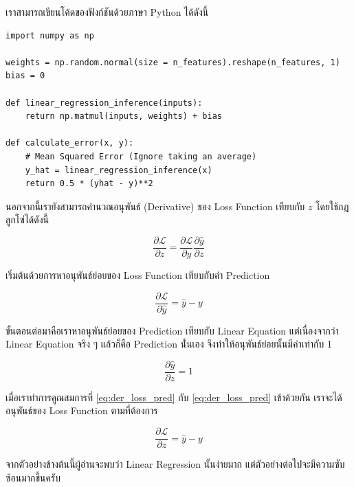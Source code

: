 เราสามารถเขียนโค้ดของฟังก์ชันด้วยภาษา Python ได้ดังนี้

\begin{lstlisting}[style=MyPython]
import numpy as np

weights = np.random.normal(size = n_features).reshape(n_features, 1)
bias = 0

def linear_regression_inference(inputs):
    return np.matmul(inputs, weights) + bias   

def calculate_error(x, y):
    # Mean Squared Error (Ignore taking an average)
    y_hat = linear_regression_inference(x)
    return 0.5 * (yhat - y)**2 
\end{lstlisting}

\vspace{1em}
นอกจากนี้เรายังสามารถคำนวณอนุพันธ์ (Derivative) ของ Loss Function เทียบกับ $z$ โดยใช้กฎลูกโซ่ได้ดังนี้

\begin{equation}\label{eq:loss_chain_rule}
    \frac{\partial \mathcal{L}}{\partial z} =
    \frac{\partial \mathcal{L}}{\partial \hat{y}} \frac{\partial \hat{y}}{\partial z}
\end{equation}

\noindent เริ่มต้นด้วยการหาอนุพันธ์ย่อยของ Loss Function เทียบกับค่า Prediction

\begin{equation}\label{eq:der_loss_pred}
    \frac{\partial \mathcal{L}}{\partial \hat{y}} = \hat{y} - y
\end{equation}

\noindent ขั้นตอนต่อมาคือเราหาอนุพันธ์ย่อยของ Prediction เทียบกับ Linear Equation แต่เนื่องจากว่า Linear Equation จริง ๆ แล้วก็คือ Prediction นั่่นเอง จึงทำให้อนุพันธ์ย่อยนั้นมีค่าเท่ากับ 1

\begin{equation}\label{eq:der_pred_lin_eq}
    \frac{\partial \hat{y}}{\partial z} = 1
\end{equation}

\noindent เมื่อเราทำการคูณสมการที่ \eqref{eq:der_loss_pred} กับ \eqref{eq:der_loss_pred} เข้าด้วยกัน เราจะได้อนุพันธ์ของ Loss
Function ตามที่ต้องการ

\begin{equation}\label{eq:der_loss_lin_eq}
    \frac{\partial \mathcal{L}}{\partial z} = \hat{y} - y
\end{equation}

\noindent จากตัวอย่างข้างต้นนี้ผู้อ่านจะพบว่า Linear Regression นั้นง่ายมาก แต่ตัวอย่างต่อไปจะมีความซับซ้อนมากขึ้นครับ

